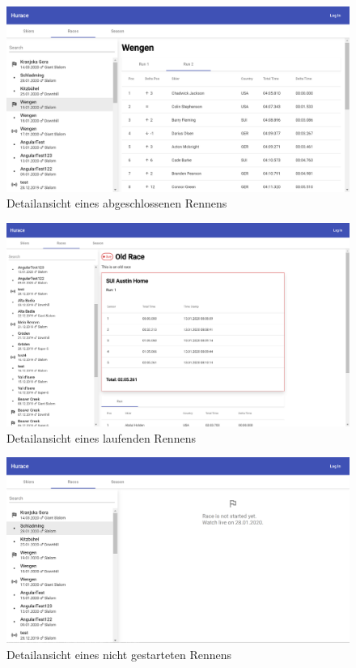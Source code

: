 \begin{figure}[H]
    \centering
    \includegraphics[width=0.9\linewidth]{images/races-detail}
    \caption{Detailansicht eines abgeschlossenen Rennens}
\label{fig:races-detail}
\end{figure}

\begin{figure}[H]
    \centering
    \includegraphics[width=0.9\linewidth]{images/races-live}
    \caption{Detailansicht eines laufenden Rennens}
\label{fig:races-live}
\end{figure}

\begin{figure}[H]
    \centering
    \includegraphics[width=0.9\linewidth]{images/races-not-started}
    \caption{Detailansicht eines nicht gestarteten Rennens}
\label{fig:races-not-started}
\end{figure}

